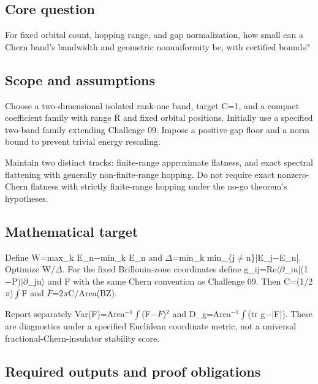 \documentclass[
  11pt,
]{article}
\begin{document}
\subsection{Core question}

For fixed orbital count, hopping range, and gap normalization, how small
can a Chern band's bandwidth and geometric nonuniformity be, with
certified bounds?

\subsection{Scope and assumptions}

Choose a two-dimensional isolated rank-one band, target C=1, and a
compact coefficient family with range R and fixed orbital positions.
Initially use a specified two-band family extending Challenge 09. Impose
a positive gap floor and a norm bound to prevent trivial energy
rescaling.

Maintain two distinct tracks: finite-range approximate flatness, and
exact spectral flattening with generally non-finite-range hopping. Do
not require exact nonzero-Chern flatness with strictly finite-range
hopping under the no-go theorem's hypotheses.

\subsection{Mathematical target}

Define W=max\_k E\_n\ensuremath{-}min\_k E\_n and
\ensuremath{\Delta}=min\_k
min\_\{j\ensuremath{\ne}n\}|E\_j\ensuremath{-}E\_n|. Optimize
W/\ensuremath{\Delta}. For the fixed Brillouin-zone coordinates define
g\_ij=Re\ensuremath{\langle}\ensuremath{\partial}\_iu|(1\ensuremath{-}P)|\ensuremath{\partial}\_ju\ensuremath{\rangle}
and F with the same Chern convention as Challenge 09. Then
C=(1/2\ensuremath{\pi})\ensuremath{\int}F and
\ensuremath{\bar{F}}=2\ensuremath{\pi}C/Area(BZ).

Report separately
Var(F)=Area\ensuremath{{}^{-1}}\ensuremath{\int}(F\ensuremath{-}\ensuremath{\bar{F}})\ensuremath{{}^{2}}
and D\_g=Area\ensuremath{{}^{-1}}\ensuremath{\int}(tr
g\ensuremath{-}|F|). These are diagnostics under a specified Euclidean
coordinate metric, not a universal fractional-Chern-insulator stability
score.

\subsection{Required outputs and proof obligations}
\end{document}
